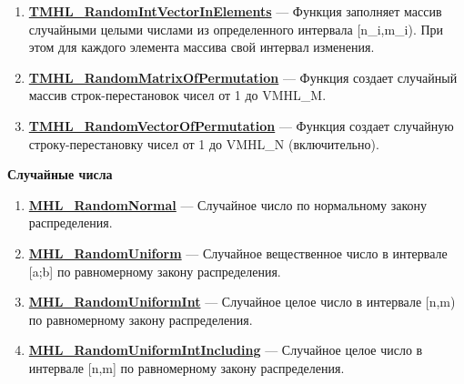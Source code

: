 \documentclass[a4paper,12pt]{article}
\begin{document}
\begin{enumerate}
\item \textbf{\hyperref[TMHL_RandomIntVectorInElements]{TMHL\_RandomIntVectorInElements}} --- Функция заполняет массив случайными целыми  числами из определенного интервала [n\_i,m\_i). При этом для каждого элемента массива свой интервал изменения.

\item \textbf{\hyperref[TMHL_RandomMatrixOfPermutation]{TMHL\_RandomMatrixOfPermutation}} --- Функция создает случайный массив строк-перестановок чисел от 1 до VMHL\_M.

\item \textbf{\hyperref[TMHL_RandomVectorOfPermutation]{TMHL\_RandomVectorOfPermutation}} --- Функция создает случайную строку-перестановку чисел от 1 до VMHL\_N (включительно).

\end{enumerate}

\textbf{Случайные числа}
\begin{enumerate}

\item \textbf{\hyperref[MHL_RandomNormal]{MHL\_RandomNormal}} --- Случайное число по нормальному закону распределения.

\item \textbf{\hyperref[MHL_RandomUniform]{MHL\_RandomUniform}} --- Случайное вещественное число в интервале [a;b] по равномерному закону распределения.

\item \textbf{\hyperref[MHL_RandomUniformInt]{MHL\_RandomUniformInt}} --- Случайное целое число в интервале [n,m) по равномерному закону распределения.

\item \textbf{\hyperref[MHL_RandomUniformIntIncluding]{MHL\_RandomUniformIntIncluding}} --- Случайное целое число в интервале [n,m] по равномерному закону распределения.

\end{enumerate}
\end{document}
